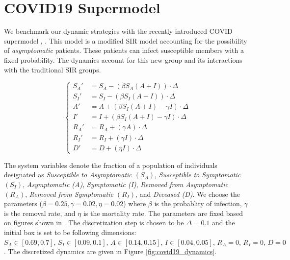 \section{COVID19 Supermodel}
\label{sec:covid}
We benchmark our dynamic strategies with the recently introduced COVID supermodel \cite{ansumali2020modelling}, \cite{indiansuper2020supermodel}. This model is a modified SIR model accounting for the possibility of \emph{asymptomatic} patients. These patients can infect susceptible members with a fixed probability. The dynamics account for this new group and its interactions with the traditional SIR groups.

\begin{center}
\begin{equation*}
  \begin{cases}
   S_A' & = S_A  -(\beta S_A(A+I))\cdot \Delta \\
   S_I' & = S_I  -(\beta S_I (A + I))\cdot \Delta \\
   A' & = A + (\beta S_I(A+I) - \gamma I)\cdot \Delta \\
   I' & = I + (\beta S_I (A+I) - \gamma I)\cdot  \Delta \\
   R_A' & = R_A + (\gamma A)\cdot \Delta \\
   R_I' & = R_I + (\gamma I)\cdot \Delta \\
   D' & = D + (\eta I)\cdot \Delta
  \end{cases}
\end{equation*}
\label{fig:covid19_dynamics}
\end{center}

The system variables denote the fraction of a population of individuals designated as \emph{Susceptible to Asymptomatic $(S_A)$}, \emph{Susceptible to Symptomatic $(S_I)$}, \emph{Asymptomatic (A)}, \emph{Symptomatic (I)}, \emph{Removed from Asymptomatic $(R_A)$}, \emph{Removed from Symptomatic $(R_I)$}, and \emph{Deceased (D)}. We choose the parameters ($\beta = 0.25, \gamma=0.02, \eta=0.02$) where $\beta$ is the probablity of infection, $\gamma$ is the removal rate, and $\eta$ is the mortality rate. The parameters are fixed based on figures shown in \cite{ansumali2020modelling}. The discretization step is chosen to be $\Delta = 0.1$ and the initial box is set to be following dimensions: $S_A  \in [0.69, 0.7], \, S_I \in [0.09, 0.1], \, A \in [0.14, 0.15], \, I \in [0.04, 0.05], \, R_A  = 0,\, R_I  = 0, \, D  = 0$. The discretized dynamics are given in Figure \ref{fig:covid19_dynamics}.

